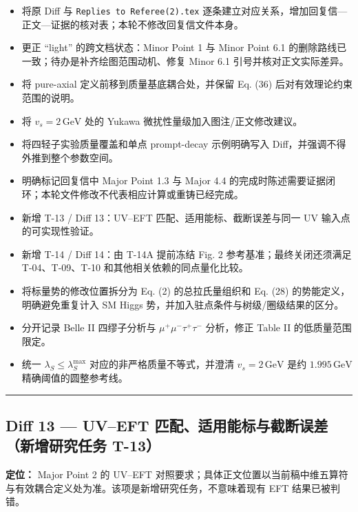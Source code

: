 \documentclass[
]{article}
\providecommand{\tightlist}{%
  \setlength{\itemsep}{0pt}\setlength{\parskip}{0pt}}
\begin{document}
\begin{itemize}
\tightlist
\item
  将原 Diff 与 \texttt{Replies\ to\ Referee(2).\hspace{0pt}tex}
  逐条建立对应关系，增加回复信---正文---证据的核对表；本轮不修改回复信文件本身。
\item
  更正 ``light'' 的跨文档状态：Minor Point 1 与 Minor Point 6.1
  的删除路线已一致；待办是补齐绘图范围动机、修复 Minor 6.1
  引号并核对正文实际差异。
\item
  将 pure-axial 定义前移到质量基底耦合处，并保留 Eq. (36)
  后对有效理论约束范围的说明。
\item
  将 \(v_s=2\,\mathrm{GeV}\) 处的 Yukawa
  微扰性量级加入图注/正文修改建议。
\item
  将四轻子实验质量覆盖和单点 prompt-decay 示例明确写入
  Diff，并强调不得外推到整个参数空间。
\item
  明确标记回复信中 Major Point 1.3 与 Major 4.4
  的完成时陈述需要证据闭环；本轮文件修改不代表相应计算或重铸已经完成。
\item
  新增 T-13 / Diff 13：UV--EFT 匹配、适用能标、截断误差与同一 UV
  输入点的可实现性验证。
\item
  新增 T-14 / Diff 14：由 T-14A 提前冻结 Fig. 2
  参考基准；最终关闭还须满足 T-04、T-09、T-10
  和其他相关依赖的同点量化比较。
\item
  将标量势的修改位置拆分为 Eq. (2) 的总拉氏量组织和 Eq. (28)
  的势能定义，明确避免重复计入 SM Higgs
  势，并加入驻点条件与树级/圈级结果的区分。
\item
  分开记录 Belle II 四缪子分析与 \(\mu^+\mu^-\tau^+\tau^-\) 分析，修正
  Table II 的低质量范围限定。
\item
  统一 \(\lambda_S\leq\lambda_S^{\max}\) 对应的非严格质量不等式，并澄清
  \(v_s=2\,\mathrm{GeV}\) 是约 \(1.995\,\mathrm{GeV}\)
  精确阈值的圆整参考线。
\end{itemize}

\begin{center}\rule{0.5\linewidth}{0.5pt}\end{center}

\subsection{Diff 13 --- UV--EFT 匹配、适用能标与截断误差（新增研究任务
T-13）}\label{diff-13-uveft-ux5339ux914dux9002ux7528ux80fdux6807ux4e0eux622aux65adux8befux5deeux65b0ux589eux7814ux7a76ux4efbux52a1-t-13}

\textbf{定位：} Major Point 2 的 UV--EFT
对照要求；具体正文位置以当前稿中维五算符与有效耦合定义处为准。该项是新增研究任务，不意味着现有
EFT 结果已被判错。
\end{document}
